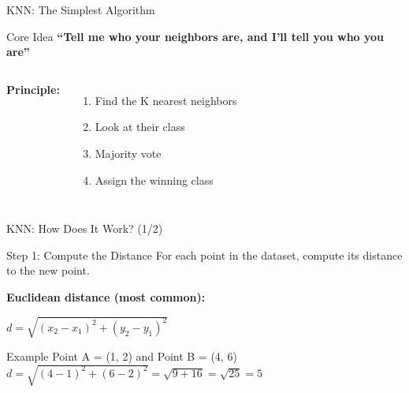 \documentclass[aspectratio=169]{beamer}
\begin{document}
\begin{frame}{KNN: The Simplest Algorithm}
\begin{block}{Core Idea}
\textbf{``Tell me who your neighbors are, and I'll tell you who you are''}
\end{block}

\vspace{0.5cm}
\begin{columns}[T]
\textbf{Principle:}
\begin{enumerate}
    \item Find the K nearest neighbors
    \item Look at their class
    \item Majority vote
    \item Assign the winning class
\end{enumerate}

\begin{center}
\end{center}
\end{columns}
\end{frame}

\begin{frame}{KNN: How Does It Work? (1/2)}
\begin{block}{Step 1: Compute the Distance}
For each point in the dataset, compute its distance to the new point.
\end{block}

\vspace{0.3cm}
\textbf{Euclidean distance (most common):}
\begin{center}
\Large
$d = \sqrt{(x_2-x_1)^2 + (y_2-y_1)^2}$
\end{center}

\vspace{0.3cm}
\begin{exampleblock}{Example}
Point A = (1, 2) and Point B = (4, 6)\\
$d = \sqrt{(4-1)^2 + (6-2)^2} = \sqrt{9 + 16} = \sqrt{25} = 5$
\end{exampleblock}
\end{frame}
\end{document}
